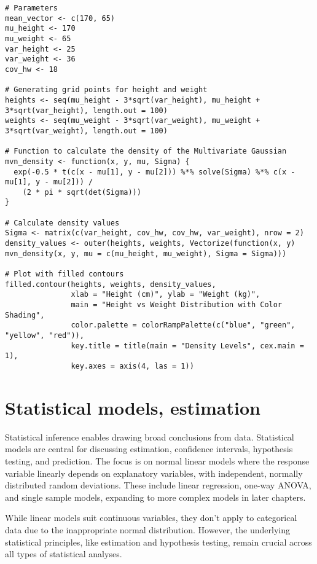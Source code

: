 \documentclass{article}
\begin{document}
\begin{lstlisting}
# Parameters
mean_vector <- c(170, 65)
mu_height <- 170
mu_weight <- 65
var_height <- 25
var_weight <- 36
cov_hw <- 18

# Generating grid points for height and weight
heights <- seq(mu_height - 3*sqrt(var_height), mu_height + 3*sqrt(var_height), length.out = 100)
weights <- seq(mu_weight - 3*sqrt(var_weight), mu_weight + 3*sqrt(var_weight), length.out = 100)

# Function to calculate the density of the Multivariate Gaussian
mvn_density <- function(x, y, mu, Sigma) {
  exp(-0.5 * t(c(x - mu[1], y - mu[2])) %*% solve(Sigma) %*% c(x - mu[1], y - mu[2])) /
    (2 * pi * sqrt(det(Sigma)))
}

# Calculate density values
Sigma <- matrix(c(var_height, cov_hw, cov_hw, var_weight), nrow = 2)
density_values <- outer(heights, weights, Vectorize(function(x, y) mvn_density(x, y, mu = c(mu_height, mu_weight), Sigma = Sigma)))

# Plot with filled contours
filled.contour(heights, weights, density_values,
               xlab = "Height (cm)", ylab = "Weight (kg)",
               main = "Height vs Weight Distribution with Color Shading",
               color.palette = colorRampPalette(c("blue", "green", "yellow", "red")),
               key.title = title(main = "Density Levels", cex.main = 1),
               key.axes = axis(4, las = 1))
\end{lstlisting}

\pagebreak

\section{Statistical models, estimation}

Statistical inference enables drawing broad conclusions from data. Statistical models are central for discussing estimation, confidence intervals, hypothesis testing, and prediction. The focus is on normal linear models where the response variable linearly depends on explanatory variables, with independent, normally distributed random deviations. These include linear regression, one-way ANOVA, and single sample models, expanding to more complex models in later chapters.

While linear models suit continuous variables, they don't apply to categorical data due to the inappropriate normal distribution. However, the underlying statistical principles, like estimation and hypothesis testing, remain crucial across all types of statistical analyses.
\end{document}
